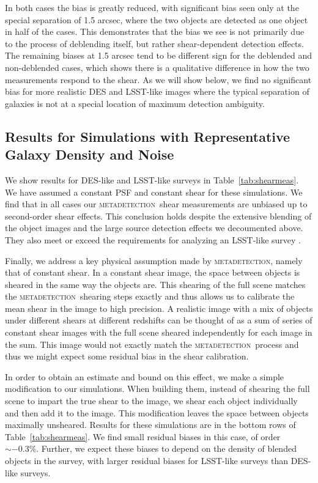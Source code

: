 \documentclass[fleqn,useAMS,usenatbib]{mnras}
\newcommand{\mdet}{\textsc{metadetection}}
\begin{document}
In both cases the bias is greatly reduced, with significant bias seen only at
the special separation of 1.5 arcsec, where the two objects are detected as one
object in half of the cases. This demonstrates that the bias we see is not
primarily due to the process of deblending itself, but rather shear-dependent
detection effects. The remaining biases at 1.5 arcsec tend to be different
sign for the deblended and non-deblended cases, which shows there is a
qualitative difference in how the two measurements respond to the shear. As we
will show below, we find no significant bias for more realistic DES and
LSST-like images where the typical separation of galaxies is not at a special
location of maximum detection ambiguity.

\subsection{Results for Simulations with Representative Galaxy Density and Noise}
\label{sec:res:constpsf}

We show results for DES-like and LSST-like surveys in Table~\ref{tab:shearmeas}.
We have assumed a constant PSF and constant shear for these simulations. We find
that in all cases our \mdet\ shear measurements are unbiased up to
second-order shear effects. This conclusion holds despite the extensive blending
of the object images and the large source detection effects we decoumented
above. They also meet or exceed the requirements for analyzing an LSST-like survey
\citep[e.g.,][]{huterer2006}.

Finally, we address a key physical assumption made by \mdet, namely that of constant
shear. In a constant shear image, the space between objects is sheared in the
same way the objects are. This shearing of the full scene matches the \mdet\
shearing steps exactly and thus allows us to calibrate the mean shear in the
image to high precision. A realistic image with a mix of objects under different
shears at different redshifts can be thought of as a sum of series of constant
shear images with the full scene sheared independently for each image in the sum.
This image would not exactly match the \mdet\ process and thus we might expect
some residual bias in the shear calibration.

In order to obtain an estimate and bound on this effect, we make a simple
modification to our simulations. When building them, instead of shearing the
full scene to impart the true shear to the image, we shear each object
individually and then add it to the image. This modification leaves the space
between objects maximally unsheared. Results for these simulations are in the
bottom rows of Table~\ref{tab:shearmeas}. We find small residual biases in this
case, of order $\sim-0.3\%$. Further, we expect these biases to depend on
the density of blended objects in the survey, with larger residual biases
for LSST-like surveys than DES-like surveys.
\end{document}

